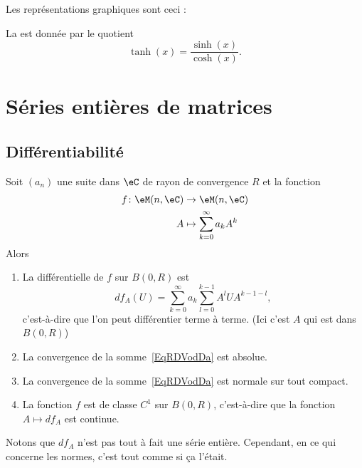 Les représentations graphiques sont ceci :
\begin{center}
	
\end{center}

La  est donnée par le quotient
\begin{equation}
	\tanh(x)=\frac{ \sinh(x) }{ \cosh(x) }.
\end{equation}

\section{Séries entières de matrices}

\subsection{Différentiabilité}

\begin{proposition} \label{PropAMBXKgV}
	Soit \( (a_n)\) une suite dans \( \eC\) de rayon de convergence \( R\) et la fonction
	\begin{equation}
		\begin{aligned}
			f\colon \eM(n,\eC) & \to \eM(n,\eC)                    \\
			A                  & \mapsto \sum_{k=0}^{\infty}a_kA^k
		\end{aligned}
	\end{equation}
	Alors
	\begin{enumerate}
		\item
		      La différentielle de \( f\) sur \( B(0,R)\) est
		      \begin{equation}    \label{EqRDVodDa}
			      df_A(U)=\sum_{k=0}^{\infty}a_k\sum_{l=0}^{k-1}A^lUA^{k-1-l},
		      \end{equation}
		      c'est-à-dire que l'on peut différentier terme à terme. (Ici c'est \( A\) qui est dans \( B(0,R)\))
		\item
		      La convergence de la somme~\ref{EqRDVodDa} est absolue.
		\item
		      La convergence de la somme~\ref{EqRDVodDa} est normale sur tout compact.
		\item
		      La fonction \( f\) est de classe \( C^1\) sur \( B(0,R)\), c'est-à-dire que la fonction \( A\mapsto df_A\) est continue.
	\end{enumerate}
\end{proposition}
Notons que \( df_A\) n'est pas tout à fait une série entière. Cependant, en ce qui concerne les normes, c'est tout comme si ça l'était.

